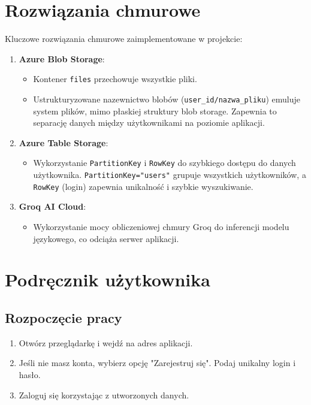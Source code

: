 \documentclass[12pt,a4paper]{article}
\begin{document}
	\section{Rozwiązania chmurowe}
	Kluczowe rozwiązania chmurowe zaimplementowane w projekcie:
	\begin{enumerate}
		\item \textbf{Azure Blob Storage}:
		\begin{itemize}
			\item Kontener \texttt{files} przechowuje wszystkie pliki.
			\item Ustrukturyzowane nazewnictwo blobów (\texttt{user\_id/nazwa\_pliku}) emuluje system plików, mimo płaskiej struktury blob storage. Zapewnia to separację danych między użytkownikami na poziomie aplikacji.
		\end{itemize}
		\item \textbf{Azure Table Storage}:
		\begin{itemize}
			\item Wykorzystanie \texttt{PartitionKey} i \texttt{RowKey} do szybkiego dostępu do danych użytkownika. \texttt{PartitionKey="users"} grupuje wszystkich użytkowników, a \texttt{RowKey} (login) zapewnia unikalność i szybkie wyszukiwanie.
		\end{itemize}
		\item \textbf{Groq AI Cloud}:
		\begin{itemize}
			\item Wykorzystanie mocy obliczeniowej chmury Groq do inferencji modelu językowego, co odciąża serwer aplikacji.
		\end{itemize}
	\end{enumerate}
	
	\newpage
	\section{Podręcznik użytkownika}
	\subsection{Rozpoczęcie pracy}
	\begin{enumerate}
		\item Otwórz przeglądarkę i wejdź na adres aplikacji.
		\item Jeśli nie masz konta, wybierz opcję "Zarejestruj się". Podaj unikalny login i hasło.
		\item Zaloguj się korzystając z utworzonych danych.
	\end{enumerate}
	
\end{document}

